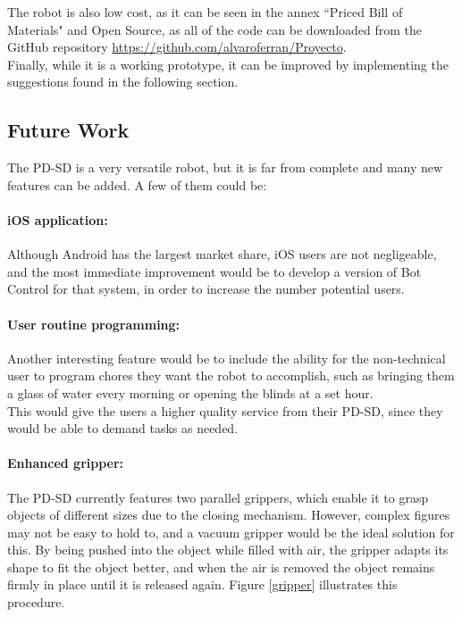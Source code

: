 The robot is also low cost, as it can be seen in the annex ``Priced Bill of Materials" and Open Source, as all of the code can be downloaded from the GitHub repository \url{https://github.com/alvaroferran/Proyecto}.\\

Finally, while it is a working prototype, it can be improved by implementing the suggestions found in the following section.





















\newpage
\subsection{Future Work}

The PD-SD is a very versatile robot, but it is far from complete and many new features can be added. A few of them could be:

\paragraph{iOS application:} Although Android has the largest market share, iOS users are not negligeable, and the most immediate improvement would be to develop a version of Bot Control for that system, in order to increase the number potential users.

\paragraph{User routine programming:} Another interesting feature would be to include the ability for the non-technical user to program chores they want the robot to accomplish, such as bringing them a glass of water every morning or opening the blinds at a set hour. \\

This would give the users a higher quality service from their PD-SD, since they would be able to demand tasks as needed.



\paragraph{Enhanced gripper:}  The PD-SD currently features two parallel grippers, which enable it to grasp objects of different sizes due to the closing mechanism. However, complex figures may not be easy to hold to, and a vacuum gripper would be the ideal solution for this. By being pushed into the object while filled with air, the gripper adapts its shape to fit the object better, and when the air is removed the object remains firmly in place until it is released again. Figure \ref{gripper} illustrates this procedure.

